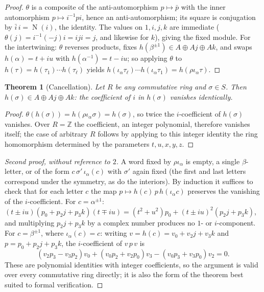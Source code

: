 \documentclass[11pt]{article}
\newtheorem{theorem}{Theorem}[section]
\theoremstyle{definition}
\theoremstyle{remark}
\newcommand{\ZZ}{\mathbb{Z}}
\newcommand{\ia}{\iota_\alpha}
\DeclareMathOperator{\N}{N}
\begin{document}
\begin{proof}
$\theta$ is a composite of the anti-automorphism $p\mapsto\bar p$ with the inner automorphism $p\mapsto i^{-1}pi$, hence an anti-automorphism; its square is conjugation by $\bar i\,i=\N(i)$, the identity. The values on $1,i,j,k$ are immediate ($\theta(j)=i^{-1}(-j)i=iji=j$, and likewise for $k$), giving the fixed module. For the intertwining: $\theta$ reverses products, fixes $h(\beta^{\pm1})\in A\oplus Aj\oplus Ak$, and swaps $h(\alpha)=t+iu$ with $h(\alpha^{-1})=t-iu$; so applying $\theta$ to $h(\tau)=h(\tau_1)\cdots h(\tau_\ell)$ yields $h(\ia\tau_\ell)\cdots h(\ia\tau_1)=h(\rho\ia\tau)$.
\end{proof}

\begin{theorem}[Cancellation]\label{thm:cancel}
Let $R$ be any commutative ring and $\sigma\in S$. Then $h(\sigma)\in A\oplus Aj\oplus Ak$: the coefficient of $i$ in $h(\sigma)$ vanishes identically.
\end{theorem}

\begin{proof}
$\theta(h(\sigma))=h(\rho\ia\sigma)=h(\sigma)$, so twice the $i$-coefficient of $h(\sigma)$ vanishes. Over $R=\ZZ$ the coefficient, an integer polynomial, therefore vanishes itself; the case of arbitrary $R$ follows by applying to this integer identity the ring homomorphism determined by the parameters $t,u,x,y,z$.
\end{proof}

\begin{proof}[Second proof, without reference to $2$]
A word fixed by $\rho\ia$ is empty, a single $\beta$-letter, or of the form $c\,\sigma'\,\ia(c)$ with $\sigma'$ again fixed (the first and last letters correspond under the symmetry, as do the interiors). By induction it suffices to check that for each letter $c$ the map $p\mapsto h(c)\,p\,h(\ia c)$ preserves the vanishing of the $i$-coefficient. For $c=\alpha^{\pm1}$: $(t\pm iu)(p_0+p_2j+p_3k)(t\mp iu)=(t^2+u^2)p_0+(t\pm iu)^2(p_2j+p_3k)$, and multiplying $p_2j+p_3k$ by a complex number produces no $1$- or $i$-component. For $c=\beta^{\pm1}$, where $\ia(c)=c$: writing $v=h(c)=v_0+v_2j+v_3k$ and $p=p_0+p_2j+p_3k$, the $i$-coefficient of $v\,p\,v$ is
\[
(v_2p_3-v_3p_2)v_0+(v_0p_2+v_2p_0)v_3-(v_0p_3+v_3p_0)v_2=0 .
\]
These are polynomial identities with integer coefficients, so the argument is valid over every commutative ring directly; it is also the form of the theorem best suited to formal verification.
\end{proof}
\end{document}
